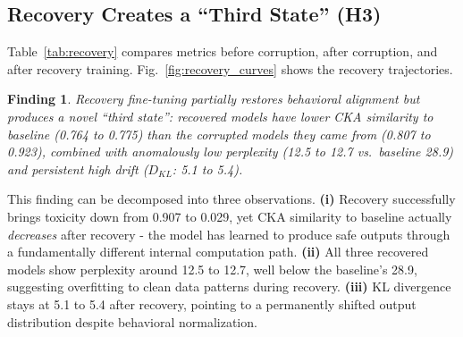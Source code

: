 \documentclass[conference]{IEEEtran}
\newtheorem{finding}{Finding}
\begin{document}
\subsection{Recovery Creates a ``Third State'' (H3)}
\label{sec:h3}

Table~\ref{tab:recovery} compares metrics before corruption, after corruption, and after recovery training. Fig.~\ref{fig:recovery_curves} shows the recovery trajectories.

\begin{finding}
Recovery fine-tuning partially restores behavioral alignment but produces a novel ``third state'': recovered models have lower CKA similarity to baseline (0.764 to 0.775) than the corrupted models they came from (0.807 to 0.923), combined with anomalously low perplexity (12.5 to 12.7 vs.\ baseline 28.9) and persistent high drift ($D_{KL}$: 5.1 to 5.4).
\end{finding}

This finding can be decomposed into three observations. \textbf{(i)} Recovery successfully brings toxicity down from 0.907 to 0.029, yet CKA similarity to baseline actually \emph{decreases} after recovery - the model has learned to produce safe outputs through a fundamentally different internal computation path. \textbf{(ii)} All three recovered models show perplexity around 12.5 to 12.7, well below the baseline's 28.9, suggesting overfitting to clean data patterns during recovery. \textbf{(iii)} KL divergence stays at 5.1 to 5.4 after recovery, pointing to a permanently shifted output distribution despite behavioral normalization.
\end{document}
